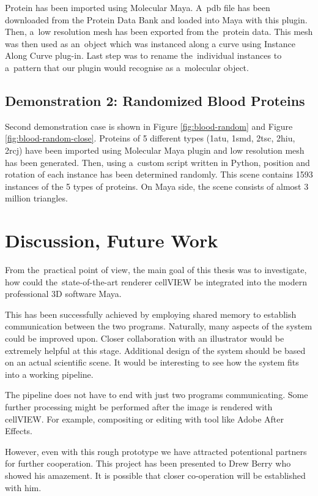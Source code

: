 \documentclass[
  digital, %
  table,   %
  nolof,     %
  nolot,     %
  oneside,
]{fithesis3}
\begin{document}
Protein has been imported using Molecular Maya. A pdb file has been downloaded from the Protein Data Bank and loaded into Maya with this plugin. Then, a low resolution mesh has been exported from the protein data. This mesh was then used as an object which was instanced along a curve using Instance Along Curve plug-in. Last step was to rename the individual instances to a pattern that our plugin would recognise as a molecular object.

\section{Demonstration 2: Randomized Blood Proteins}
Second demonstration case is shown in Figure \ref{fig:blood-random} and Figure \ref{fig:blood-random-close}. Proteins of 5 different types (1atu, 1smd, 2tsc, 2hiu, 2rcj) have been imported using Molecular Maya plugin and low resolution mesh has been generated. Then, using a custom script written in Python, position and rotation of each instance has been determined randomly.
This scene contains 1593 instances of the 5 types of proteins. On Maya side, the scene consists of almost 3 million triangles.

\chapter{Discussion, Future Work}
\label{chap:discussion}
From the practical point of view, the main goal of this thesis was to investigate, how could the state-of-the-art renderer cellVIEW be integrated into the modern professional 3D software Maya.

This has been successfully achieved by employing shared memory to establish communication between the two programs. Naturally, many aspects of the system could be improved upon.
Closer collaboration with an illustrator would be extremely helpful at this stage. Additional design of the system should be based on an actual scientific scene. It would be interesting to see how the system fits into a working pipeline.

The pipeline does not have to end with just two programs communicating. Some further processing might be performed after the image is rendered with cellVIEW. For example, compositing or editing with tool like Adobe After Effects.

However, even with this rough prototype we have attracted potentional partners for further cooperation. This project has been presented to Drew Berry who showed his amazement. It is possible that closer co-operation will be established with him.
\end{document}
